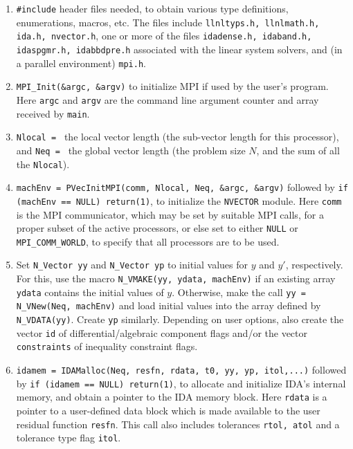 \documentclass[11pt]{article}
\begin{document}
\begin{enumerate}

\item {\tt \#include} header files needed, to obtain various type
definitions, enumerations, macros, etc.  The files include
{\tt llnltyps.h, llnlmath.h, ida.h, nvector.h}, one or more of the
files  {\tt idadense.h, idaband.h, idaspgmr.h, idabbdpre.h} associated
with the linear system solvers, and (in a parallel environment) 
{\tt mpi.h}.

\item {\tt MPI\_Init(\&argc, \&argv)} to initialize MPI if used by
the user's program.  Here {\tt argc} and {\tt argv} are the command
line argument counter and array received by {\tt main}.

\item {\tt Nlocal = } the local vector length (the sub-vector
length for this processor), and \newline
{\tt Neq = } the global vector length (the problem size $N$, and the
sum of all the {\tt Nlocal}).

\item {\tt machEnv = PVecInitMPI(comm, Nlocal, Neq, \&argc, \&argv)}
followed by \newline
{\tt if (machEnv == NULL) return(1)}, to initialize the 
{\tt NVECTOR} module.  Here {\tt comm} is the MPI communicator, which
may be set by suitable MPI calls, for a proper subset of the active
processors, or else set to either {\tt NULL} or 
{\tt MPI\_COMM\_WORLD}, to specify that all processors are to be used.

\item Set {\tt N\_Vector yy} and {\tt N\_Vector yp} to initial
values for $y$ and $y'$, respectively.  For this, use the macro
{\tt N\_VMAKE(yy, ydata, machEnv)} if an existing array {\tt ydata} 
contains the initial values of $y$.  Otherwise, make the call
{\tt yy = N\_VNew(Neq, machEnv)} and load initial values into
the array defined by {\tt N\_VDATA(yy)}.  Create {\tt yp} similarly.
Depending on user options, also create the vector {\tt id} of 
differential/algebraic component flags and/or the vector 
{\tt constraints} of inequality constraint flags.

\item {\tt idamem = IDAMalloc(Neq, resfn, rdata, t0, yy, yp, itol,...)} 
followed by \newline
{\tt if (idamem == NULL) return(1)}, to allocate and initialize
IDA's internal memory, and obtain a pointer to the IDA memory block.  
Here {\tt rdata} is a pointer to a user-defined data block which is
made available to the user residual function {\tt resfn}.
This call also includes tolerances {\tt rtol, atol} and a 
tolerance type flag {\tt itol}.


\end{enumerate}
\end{document}
